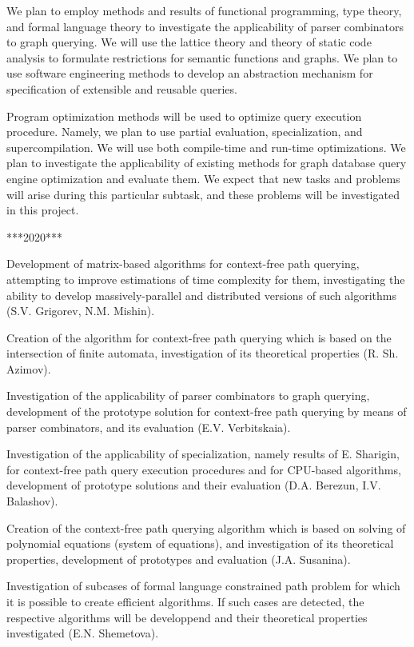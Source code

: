 \documentclass[12pt]{article}  %
\theoremstyle{remark}
\begin{document}
We plan to employ methods and results of functional programming, type theory, and formal language theory to investigate the applicability of parser combinators to graph querying.
We will use the lattice theory and theory of static code analysis to formulate restrictions for semantic functions and graphs.
We plan to use software engineering methods to develop an abstraction mechanism for specification of extensible and reusable queries.

Program optimization methods will be used to optimize query execution procedure.
Namely, we plan to use partial evaluation, specialization, and supercompilation.
We will use both compile-time and run-time optimizations.
We plan to investigate the applicability of existing methods for graph database query engine optimization and evaluate them.
We expect that new tasks and problems will arise during this particular subtask, and these problems will be investigated in this project.

***2020***

Development of matrix-based algorithms for context-free path querying, attempting to improve estimations of time complexity for them, investigating the ability to develop massively-parallel and distributed versions of such algorithms (S.V. Grigorev, N.M. Mishin).

Creation of the algorithm for context-free path querying which is based on the intersection of finite automata, investigation of its theoretical properties (R. Sh. Azimov).

Investigation of the applicability of parser combinators to graph querying, development of the prototype solution for context-free path querying by means of parser combinators, and its evaluation (E.V. Verbitskaia).

Investigation of the applicability of specialization, namely results of E. Sharigin, for context-free path query execution procedures and for CPU-based algorithms, development of  prototype solutions and their evaluation (D.A. Berezun, I.V. Balashov).

Creation of the context-free path querying algorithm which is based on solving of polynomial equations (system of equations), and investigation of its theoretical properties, development of  prototypes and evaluation (J.A. Susanina).

Investigation of subcases of formal language constrained path problem for which it is possible to create efficient algorithms.
If such cases are detected, the respective algorithms will be developpend and their theoretical properties investigated (E.N. Shemetova).
\end{document}
